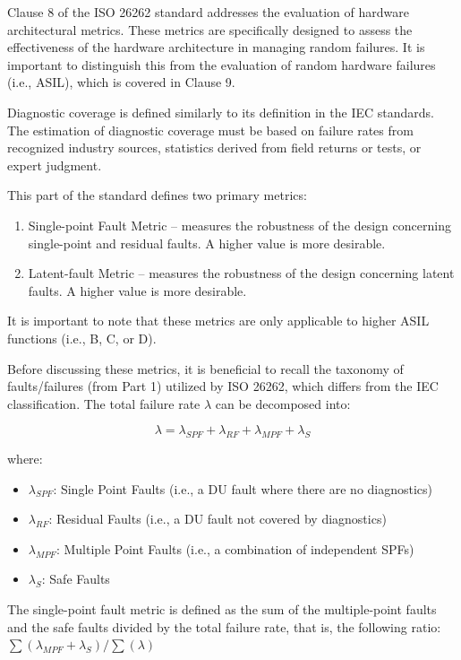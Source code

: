 \documentclass[./dissertation.tex]{subfiles}
\begin{document}
Clause 8 of the ISO 26262 standard addresses the evaluation of hardware architectural metrics. These metrics are specifically designed to assess the effectiveness of the hardware architecture in managing random failures. It is important to distinguish this from the evaluation of random hardware failures (i.e., ASIL), which is covered in Clause 9.

Diagnostic coverage is defined similarly to its definition in the IEC standards. The estimation of diagnostic coverage must be based on failure rates from recognized industry sources, statistics derived from field returns or tests, or expert judgment.

This part of the standard defines two primary metrics:

\begin{enumerate}
\item Single-point Fault Metric – measures the robustness of the design concerning single-point and residual faults. A higher value is more desirable.
\item Latent-fault Metric – measures the robustness of the design concerning latent faults. A higher value is more desirable.
\end{enumerate}

It is important to note that these metrics are only applicable to higher ASIL functions (i.e., B, C, or D).

Before discussing these metrics, it is beneficial to recall the taxonomy of faults/failures (from Part 1) utilized by ISO 26262, which differs from the IEC classification. The total failure rate $\lambda$ can be decomposed into:

\begin{equation}
\lambda = \lambda_{SPF} + \lambda_{RF} + \lambda_{MPF} + \lambda_{S}
\end{equation}

where:

\begin{itemize}
\item $\lambda_{SPF}$: Single Point Faults (i.e., a DU fault where there are no diagnostics)
\item $\lambda_{RF}$: Residual Faults (i.e., a DU fault not covered by diagnostics)
\item $\lambda_{MPF}$: Multiple Point Faults (i.e., a combination of independent SPFs)
\item $\lambda_{S}$: Safe Faults
\end{itemize}

The single-point fault metric is defined as the sum of the multiple-point faults and the safe faults divided by the total failure rate, that is, the following ratio: $\sum(\lambda_{MPF} + \lambda_{S}) / \sum(\lambda)$
\end{document}
